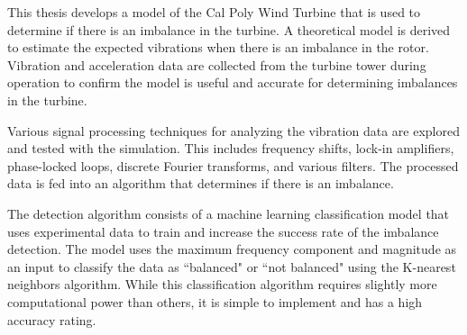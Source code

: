 This thesis develops a model of the Cal Poly Wind Turbine that is used to determine if there is an imbalance in the turbine.  A theoretical model is derived to estimate the expected vibrations when there is an imbalance in the rotor.  Vibration and acceleration data are collected from the turbine tower during operation to confirm the model is useful and accurate for determining imbalances in the turbine.  

Various signal processing techniques for analyzing the vibration data are explored and tested with the simulation.  This includes frequency shifts, lock-in amplifiers, phase-locked loops, discrete Fourier transforms, and various filters.  The processed data is fed into an algorithm that determines if there is an imbalance.

The detection algorithm consists of a machine learning classification model that uses experimental data to train and increase the success rate of the imbalance detection.  The model uses the maximum frequency component and magnitude as an input to classify the data as ``balanced" or ``not balanced" using the K-nearest neighbors algorithm.  While this classification algorithm requires slightly more computational power than others, it is simple to implement and has a high accuracy rating.


